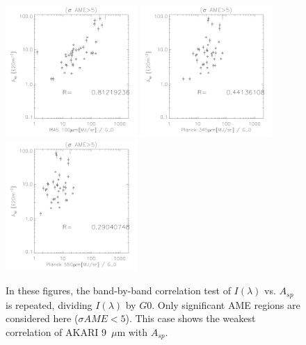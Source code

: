 \begin{figure}[!htb]
  \includegraphics[width=50mm]{IRIntG0MWAmp/iras100G0_Asp_sp.pdf}
  \includegraphics[width=50mm]{IRIntG0MWAmp/planck857G0_Asp_sp.pdf}
  \includegraphics[width=50mm]{IRIntG0MWAmp/planck545G0_Asp_sp.pdf}
\caption{In these figures, the band-by-band correlation test of $I({\lambda})$ vs. $A_{sp}$ is repeated, dividing $I({\lambda})$ by $G0$. Only significant AME regions are considered here ($\sigma AME < 5$). This case shows the weakest correlation of AKARI 9~$\mu$m with $A_{sp}$.
}
\label{fig:IRIntG0MWAmpsp}
\end{figure}
